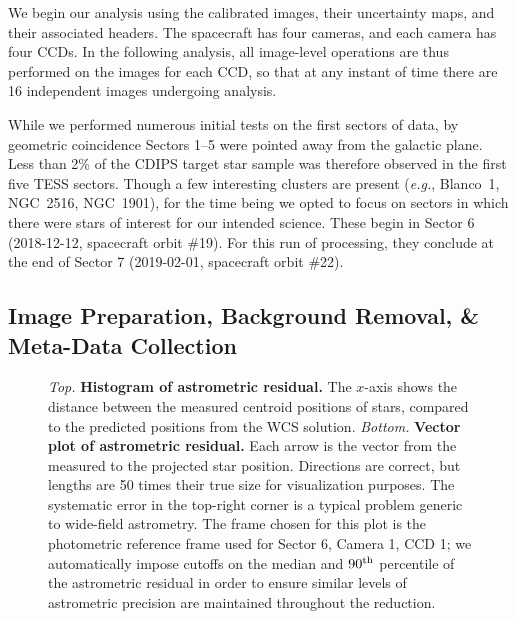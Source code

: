 \documentclass[12pt,twocolumn,tighten]{aastex62}
\begin{document}
We begin our analysis using the calibrated images, their uncertainty
maps, and their associated headers.  The spacecraft has four cameras,
and each camera has four CCDs.  In the following analysis, all
image-level operations are thus performed on the images for each CCD,
so that at any instant of time there are 16 independent images
undergoing analysis.

While we performed numerous initial tests on the first sectors of data,
by geometric coincidence Sectors 1--5 were pointed away from the galactic plane.
Less than 2\% of the CDIPS target star sample
was therefore observed in the first five TESS sectors.
Though a few interesting clusters are present ({\it e.g.}, Blanco~1, NGC~2516, NGC~1901),
for the time being we opted to focus on sectors in which there were stars
of interest for our intended science.
These begin in Sector 6 (2018-12-12, spacecraft orbit \#19).
For this run of processing, they conclude at the end of Sector 7
(2019-02-01, spacecraft orbit \#22).

\subsection{Image Preparation, Background Removal, \& Meta-Data Collection}
\label{subsec:preparation}


\begin{figure}[!t]
	\vspace{-0.8cm}
	\vspace{-0.8cm}
    \caption{
		{\it Top.} {\bf Histogram of astrometric residual.} The $x$-axis shows 
		the distance between the measured centroid positions of stars, 
		compared to the predicted positions from the WCS solution.
		{\it Bottom.} {\bf Vector plot of astrometric residual.} Each arrow is 
		the vector from the measured to the projected star position. 
		Directions are correct, but lengths are 50 times their true size for 
		visualization purposes.
    The systematic error in the top-right corner is a typical
    problem generic to wide-field astrometry.
    The frame chosen for this plot is the photometric reference frame used 
    for Sector 6, Camera 1, CCD 1; we automatically 
    impose cutoffs on the median and $90^{\rm th}$ percentile of the 
    astrometric residual in order to ensure similar levels of astrometric 
    precision are maintained throughout the reduction.
	}
	\label{fig:astromresid}
\end{figure}
\end{document}
